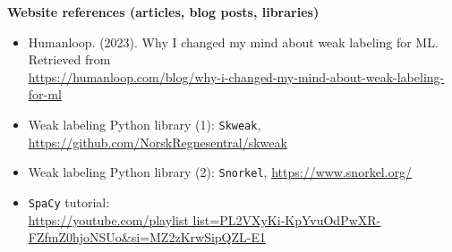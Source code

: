 \documentclass[11pt]{article}
\begin{document}
\textbf{Website references (articles, blog posts, libraries) }

\begin{itemize}
    \item Humanloop. (2023). Why I changed my mind about weak labeling for ML. Retrieved from\\ \url{https://humanloop.com/blog/why-i-changed-my-mind-about-weak-labeling-for-ml}
    \item Weak labeling Python library (1): \texttt{Skweak}, \url{https://github.com/NorskRegnesentral/skweak}
    \item Weak labeling Python library (2): \texttt{Snorkel}, \url{https://www.snorkel.org/}
    \item \texttt{SpaCy} tutorial: \\
    \url{https://youtube.com/playlist list=PL2VXyKi-KpYvuOdPwXR-FZfmZ0hjoNSUo&si=MZ2zKrwSipQZL-E1}
\end{itemize}



 






























\end{document}

